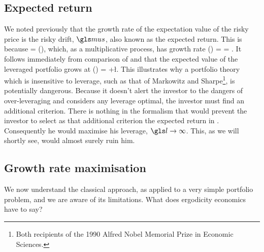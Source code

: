 \subsection{Expected return}
We noted previously that the growth rate of the expectation value of the risky price is the risky drift, $\mus$, also known as the expected return. This is because
\be
\ave{\xone(\tn+\Dt)} = \ave{\xone(\tn)}\exp(\mus \Dt),
\ee
which, as a multiplicative process, has growth rate
\be
\gm(\ave{\xone}) = \frac{\D\ln\ave{\xone}}{\Dt} = \mus.
\ee
It follows immediately from comparison of  and  that the expected value of the leveraged portfolio grows at
\be
\gm(\ave{\xl}) = \mur+\l\mue.
\ee
This illustrates why a portfolio theory which is insensitive to leverage, such as that of Markowitz and Sharpe\footnote{Both recipients of the 1990 Alfred Nobel Memorial Prize in Economic Sciences.}, is potentially dangerous. Because it doesn't alert the investor to the dangers of over-leveraging and considers any leverage optimal, the investor must find an additional criterion. There is nothing in the formalism that would prevent the investor to select as that additional criterion the expected return in . Consequently he would maximise his leverage, $\l\to\infty$. This, as we will shortly see, would almost surely ruin him.

\subsection{Growth rate maximisation}
We now understand the classical approach, as applied to a very simple portfolio problem, and we are aware of its limitations. What does ergodicity economics have to say?

